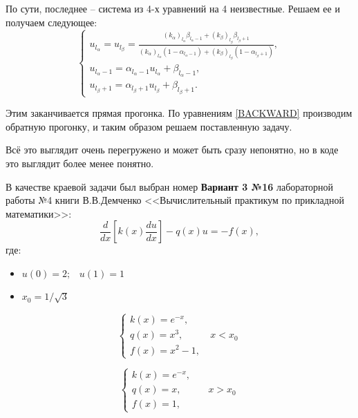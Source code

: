 		По сути, последнее -- система из 4-х уравнений на 4 неизвестные. Решаем ее и получаем следующее:
		\begin{equation*}
			\begin{cases}
				u_{l_\alpha} = u_{l_\beta} = \displaystyle\frac{(k_\alpha)_{l_\alpha}\beta_{l_\alpha - 1} + (k_\beta)_{l_\beta}\beta_{l_\beta + 1}}{(k_\alpha)_{l_\alpha}(1 - \alpha_{l_\alpha - 1}) + (k_\beta)_{l_\beta} (1 - \alpha_{l_\beta + 1})}, \\
				
				u_{l_\alpha - 1} = \alpha_{l_\alpha - 1} u_{l_\alpha} + \beta_{l_\alpha - 1}, \\
				u_{l_\beta + 1} = \alpha_{l_\beta + 1} u_{l_\beta} + \beta_{l_\beta + 1}.
			\end{cases}
		\end{equation*}
		
		Этим заканчивается прямая прогонка. По уравнениям \eqref{BACKWARD} производим обратную прогонку, и таким образом решаем поставленную задачу.
		
		Всё это выглядит очень перегружено и может быть сразу непонятно, но в коде это выглядит более менее понятно.
		
		
		
		
		
		\newpage
		В качестве краевой задачи был выбран номер \textbf{Вариант 3 №16} лабораторной работы №4 книги В.В.Демченко <<Вычислительный практикум по прикладной математики>>:
		\begin{equation*}
			\frac{d}{dx}\left[k(x)\frac{du}{dx}\right] - q(x)u = -f(x),
		\end{equation*}
		\noindent где:
		\begin{itemize}
			\item $u(0) = 2; \;\;\; u(1) = 1$
			
			\item $x_0 = 1/\sqrt{3}$ 
		\end{itemize}
	
		\begin{equation*}
			\begin{cases}
				k(x) = e^{-x}, \\
				q(x) = x^3, \;\;\;\;\;\;\;\;\;\; x < x_0 \\
				f(x) = x^2 - 1,
			\end{cases}
		\end{equation*}
		
		
		\begin{equation*}
			\begin{cases}
				k(x) = e^{-x}, \\
				q(x) = x, \;\;\;\;\;\;\;\;\;\; x > x_0 \\
				f(x) = 1,
			\end{cases}
		\end{equation*}
		
